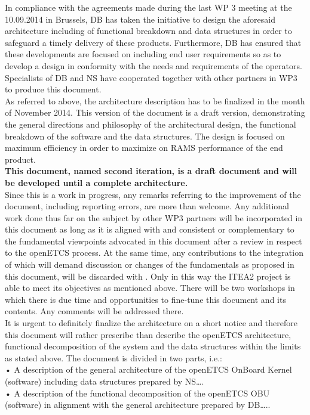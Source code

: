\documentclass{template/openetcs_report}
\begin{document}
In compliance with the agreements made during the last WP 3 meeting at the 10.09.2014 in Brussels, DB has taken the initiative to design the aforesaid architecture including of functional breakdown and data structures in order to safeguard a timely delivery of these products. Furthermore, DB has ensured that these developments are focused on including end user requirements so as to develop a design in conformity with the needs and requirements of the operators. Specialists of DB and NS have cooperated together with other partners in WP3 to produce this document.\\

As referred to above, the architecture description has to be finalized in the month of November 2014. This version of the document is a draft version, demonstrating the general directions and philosophy of the architectural design, the functional breakdown of the software and the data structures. The design is focused on maximum efficiency in order to maximize on RAMS performance of the end product.\\

\textbf{This document, named second iteration, is a draft document and will be developed until a complete architecture.}\\

Since this is a work in progress, any remarks referring to the improvement of the document, including reporting errors, are more than welcome. Any additional work done thus far on the subject by other WP3 partners will be incorporated in this document as long as it is aligned with and consistent or complementary  to the fundamental viewpoints advocated in this document after a review in respect to the openETCS process. At the same time, any contributions to the  integration of which will demand discussion or changes of the fundamentals as proposed in this document, will be discarded with . Only in this way the ITEA2 project is able to meet its objectives as mentioned above. There will be two workshops in which there is due time and opportunities to fine-tune this document and its contents. Any comments will be addressed there.\\

It is urgent to definitely finalize the architecture on a short notice and therefore this document will rather prescribe than describe the openETCS architecture, functional decomposition of the system and the data structures within the limits as stated above. The document is divided in two parts, i.e.:\\
•	A description of the general architecture of the openETCS OnBoard Kernel (software) including data structures prepared by NS….\\
•	A description of the functional decomposition of the openETCS OBU (software) in alignment with the general architecture prepared by DB…..\\
\end{document}
